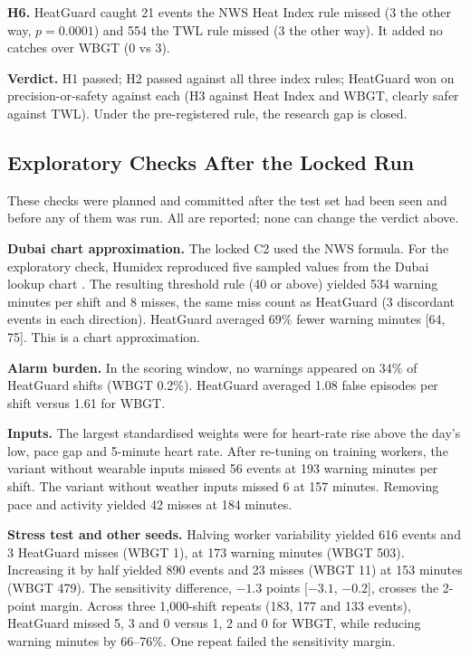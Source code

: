\documentclass[conference,a4paper]{IEEEtran}
\begin{document}
\textbf{H6.} HeatGuard caught 21 events the NWS Heat Index rule missed (3 the other way, $p=0.0001$) and 554 the TWL rule missed (3 the other way). It added no catches over WBGT (0 vs 3).

\textbf{Verdict.} H1 passed; H2 passed against all three index rules; HeatGuard won on precision-or-safety against each (H3 against Heat Index and WBGT, clearly safer against TWL). Under the pre-registered rule, the research gap is closed.

\subsection{Exploratory Checks After the Locked Run}
These checks were planned and committed after the test set had been seen and before any of them was run. All are reported; none can change the verdict above.

\textbf{Dubai chart approximation.} The locked C2 used the NWS formula. For the exploratory check, Humidex \cite{humidex} reproduced five sampled values from the Dubai lookup chart \cite{dm}. The resulting threshold rule (40 or above) yielded 534 warning minutes per shift and 8 misses, the same miss count as HeatGuard (3 discordant events in each direction). HeatGuard averaged 69\% fewer warning minutes [64, 75]. This is a chart approximation.

\textbf{Alarm burden.} In the scoring window, no warnings appeared on 34\% of HeatGuard shifts (WBGT 0.2\%). HeatGuard averaged 1.08 false episodes per shift versus 1.61 for WBGT.

\textbf{Inputs.} The largest standardised weights were for heart-rate rise above the day's low, pace gap and 5-minute heart rate. After re-tuning on training workers, the variant without wearable inputs missed 56 events at 193 warning minutes per shift. The variant without weather inputs missed 6 at 157 minutes. Removing pace and activity yielded 42 misses at 184 minutes.

\textbf{Stress test and other seeds.} Halving worker variability yielded 616 events and 3 HeatGuard misses (WBGT 1), at 173 warning minutes (WBGT 503). Increasing it by half yielded 890 events and 23 misses (WBGT 11) at 153 minutes (WBGT 479). The sensitivity difference, $-1.3$ points [$-3.1$, $-0.2$], crosses the 2-point margin. Across three 1,000-shift repeats (183, 177 and 133 events), HeatGuard missed 5, 3 and 0 versus 1, 2 and 0 for WBGT, while reducing warning minutes by 66--76\%. One repeat failed the sensitivity margin.
\end{document}
